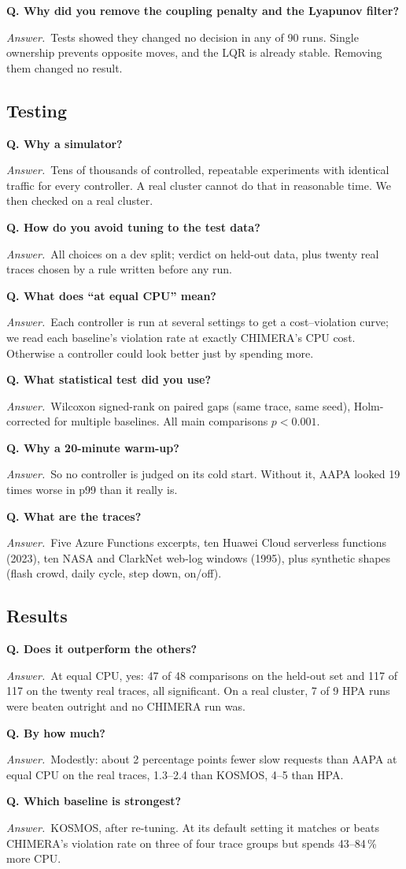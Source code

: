 \documentclass[11pt,a4paper]{article}
\newcommand{\Q}[1]{\par\medskip\textbf{Q. #1}\par}
\newcommand{\A}{\textit{Answer.}~}
\begin{document}
\Q{Why did you remove the coupling penalty and the Lyapunov filter?}
\A Tests showed they changed no decision in any of 90 runs. Single ownership prevents
opposite moves, and the LQR is already stable. Removing them changed no result.

\subsection*{Testing}
\Q{Why a simulator?}
\A Tens of thousands of controlled, repeatable experiments with identical traffic for
every controller. A real cluster cannot do that in reasonable time. We then checked on a
real cluster.

\Q{How do you avoid tuning to the test data?}
\A All choices on a dev split; verdict on held-out data, plus twenty real traces chosen by
a rule written before any run.

\Q{What does ``at equal CPU'' mean?}
\A Each controller is run at several settings to get a cost--violation curve; we read each
baseline's violation rate at exactly CHIMERA's CPU cost. Otherwise a controller could look
better just by spending more.

\Q{What statistical test did you use?}
\A Wilcoxon signed-rank on paired gaps (same trace, same seed), Holm-corrected for multiple
baselines. All main comparisons $p<0.001$.

\Q{Why a 20-minute warm-up?}
\A So no controller is judged on its cold start. Without it, AAPA looked 19 times worse in
p99 than it really is.

\Q{What are the traces?}
\A Five Azure Functions excerpts, ten Huawei Cloud serverless functions (2023), ten NASA
and ClarkNet web-log windows (1995), plus synthetic shapes (flash crowd, daily cycle, step
down, on/off).

\subsection*{Results}
\Q{Does it outperform the others?}
\A At equal CPU, yes: 47 of 48 comparisons on the held-out set and 117 of 117 on the twenty
real traces, all significant. On a real cluster, 7 of 9 HPA runs were beaten outright and
no CHIMERA run was.

\Q{By how much?}
\A Modestly: about 2 percentage points fewer slow requests than AAPA at equal CPU on the
real traces, 1.3--2.4 than KOSMOS, 4--5 than HPA.

\Q{Which baseline is strongest?}
\A KOSMOS, after re-tuning. At its default setting it matches or beats CHIMERA's violation
rate on three of four trace groups but spends 43--84\,\% more CPU.
\end{document}
